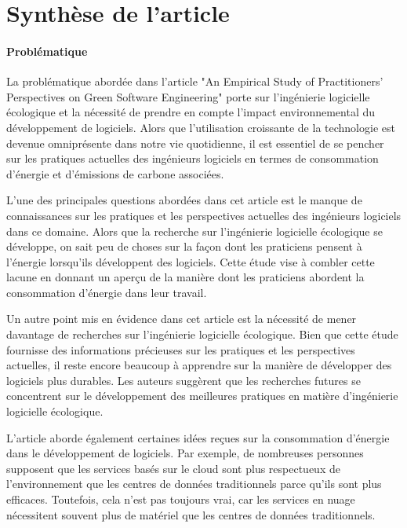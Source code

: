 \section{Synthèse de l'article}

\paragraph{Problématique}
La problématique abordée dans l'article "An Empirical Study of Practitioners' Perspectives on Green Software Engineering" porte sur l'ingénierie logicielle écologique et la nécessité de prendre en compte l'impact environnemental du développement de logiciels. Alors que l'utilisation croissante de la technologie est devenue omniprésente dans notre vie quotidienne, il est essentiel de se pencher sur les pratiques actuelles des ingénieurs logiciels en termes de consommation d'énergie et d'émissions de carbone associées.

L'une des principales questions abordées dans cet article est le manque de connaissances sur les pratiques et les perspectives actuelles des ingénieurs logiciels dans ce domaine. Alors que la recherche sur l'ingénierie logicielle écologique se développe, on sait peu de choses sur la façon dont les praticiens pensent à l'énergie lorsqu'ils développent des logiciels. Cette étude vise à combler cette lacune en donnant un aperçu de la manière dont les praticiens abordent la consommation d'énergie dans leur travail.

Un autre point mis en évidence dans cet article est la nécessité de mener davantage de recherches sur l'ingénierie logicielle écologique. Bien que cette étude fournisse des informations précieuses sur les pratiques et les perspectives actuelles, il reste encore beaucoup à apprendre sur la manière de développer des logiciels plus durables. Les auteurs suggèrent que les recherches futures se concentrent sur le développement des meilleures pratiques en matière d'ingénierie logicielle écologique.

L'article aborde également certaines idées reçues sur la consommation d'énergie dans le développement de logiciels. Par exemple, de nombreuses personnes supposent que les services basés sur le cloud sont plus respectueux de l'environnement que les centres de données traditionnels parce qu'ils sont plus efficaces. Toutefois, cela n'est pas toujours vrai, car les services en nuage nécessitent souvent plus de matériel que les centres de données traditionnels.


